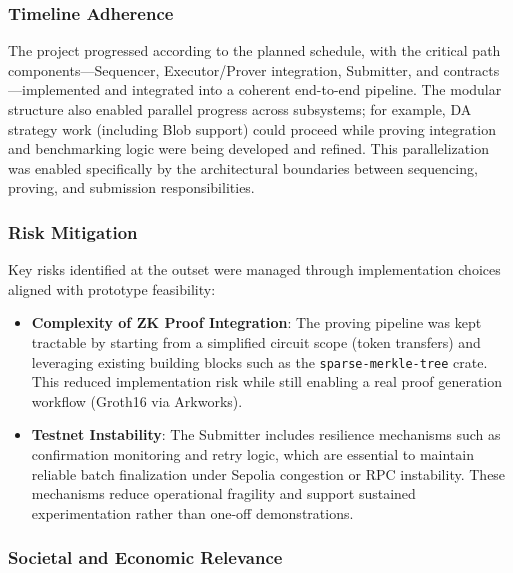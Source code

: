 \subsubsection{Timeline Adherence}
\vspace{12pt}

The project progressed according to the planned schedule, with the critical path components—Sequencer, Executor/Prover integration, Submitter, and contracts—implemented and integrated into a coherent end-to-end pipeline. The modular structure also enabled parallel progress across subsystems; for example, DA strategy work (including Blob support) could proceed while proving integration and benchmarking logic were being developed and refined. This parallelization was enabled specifically by the architectural boundaries between sequencing, proving, and submission responsibilities.

\subsubsection{Risk Mitigation}
\vspace{12pt}

Key risks identified at the outset were managed through implementation choices aligned with prototype feasibility:

\begin{itemize}
    \item \textbf{Complexity of ZK Proof Integration}: The proving pipeline was kept tractable by starting from a simplified circuit scope (token transfers) and leveraging existing building blocks such as the \texttt{sparse-merkle-tree} crate. This reduced implementation risk while still enabling a real proof generation workflow (Groth16 via Arkworks).
    
    \item \textbf{Testnet Instability}: The Submitter includes resilience mechanisms such as confirmation monitoring and retry logic, which are essential to maintain reliable batch finalization under Sepolia congestion or RPC instability. These mechanisms reduce operational fragility and support sustained experimentation rather than one-off demonstrations.
\end{itemize}

\subsubsection{Societal and Economic Relevance}
\vspace{12pt}

